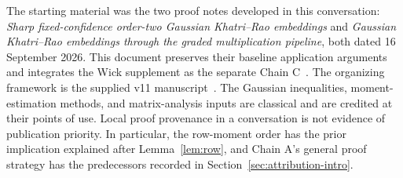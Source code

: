\documentclass[11pt]{article}
\numberwithin{equation}{section}
\theoremstyle{definition}\newtheorem{definition}[theorem]{Definition}
\theoremstyle{remark}\newtheorem{remark}[theorem]{Remark}
\begin{document}
The starting material was the two proof notes developed in this conversation:
\emph{Sharp fixed-confidence order-two Gaussian Khatri--Rao embeddings} and
\emph{Gaussian Khatri--Rao embeddings through the graded multiplication pipeline},
both dated 16 September 2026. This document preserves their baseline application arguments and integrates
the Wick supplement as the separate Chain C~\cite{WickNote,RMPS,Janson}.
The organizing framework is the supplied v11 manuscript~\cite{Framework}.
The Gaussian inequalities, moment-estimation methods, and matrix-analysis inputs
are classical and are credited at their points of use. Local proof provenance
in a conversation is not evidence of publication priority. In particular, the
row-moment order has the prior implication explained after Lemma~\ref{lem:row},
and Chain A's general proof strategy has the predecessors recorded in
Section~\ref{sec:attribution-intro}.

\clearpage
\end{document}

